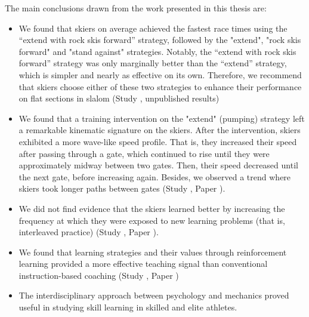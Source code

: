 The main conclusions drawn from the work presented in this thesis are:

\begin{itemize}
    \item We found that skiers on average achieved the fastest race times using the “extend with rock skis forward” strategy, followed by the "extend", "rock skis forward" and "stand against" strategies. Notably, the “extend with rock skis forward” strategy was only marginally better than the “extend” strategy, which is simpler and nearly as effective on its own. Therefore, we recommend that skiers choose either of these two strategies to enhance their performance on flat sections in slalom (Study , unpublished results) 
    \item We found that a training intervention on the "extend" (pumping) strategy left a remarkable kinematic signature on the skiers. After the intervention, skiers exhibited a more wave-like speed profile. That is, they increased their speed after passing through a gate, which continued to rise until they were approximately midway between two gates. Then, their speed decreased until the next gate, before increasing again. Besides, we observed a trend where skiers took longer paths between gates (Study , Paper ). 
    \item We did not find evidence that the skiers learned better by increasing the frequency at which they were exposed to new learning problems (that is, interleaved practice) (Study , Paper ).
    \item We found that learning strategies and their values through reinforcement learning provided a more effective teaching signal than conventional instruction-based coaching (Study , Paper )
    \item The interdisciplinary approach between psychology and mechanics proved useful in studying skill learning in skilled and elite athletes.
\end{itemize}